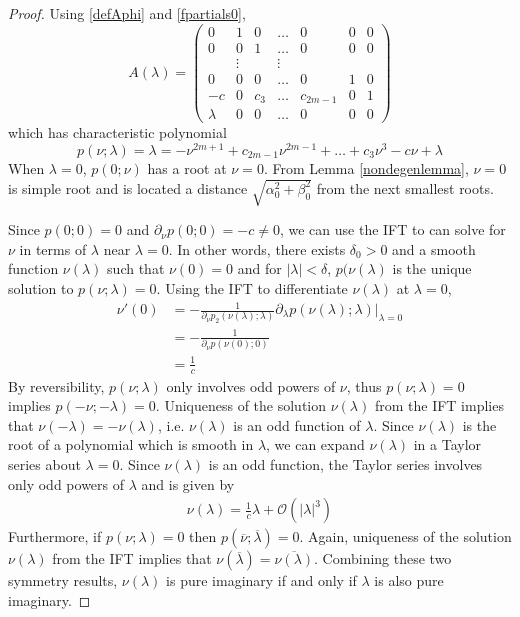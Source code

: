 \documentclass[thesis.tex]{subfiles}
\begin{document}
\begin{lemma}
\begin{proof}
Using \eqref{defAphi} and \eqref{fpartials0},
\begin{equation}\label{Alambdaform}
A(\lambda) = 
\begin{pmatrix}
0 & 1 & 0 & \dots & 0 & 0 & 0 \\
0 & 0 & 1 & \dots & 0 & 0 & 0\\
& \vdots && \vdots \\
0 & 0 & 0 & \dots & 0 & 1 & 0 \\
- c & 0 & c_3 & \dots & c_{2m-1} & 0 & 1 \\
\lambda & 0 & 0 & \dots & 0 & 0 & 0
\end{pmatrix}
\end{equation}
which has characteristic polynomial
\begin{equation}\label{charpolyA0lambda}
p(\nu; \lambda) = \lambda = -\nu^{2m+1} + c_{2m-1} \nu^{2m-1} + \dots + c_3 \nu^3 - c \nu + \lambda
\end{equation}
When $\lambda = 0$, $p(0; \nu)$ has a root at $\nu = 0$. From Lemma \ref{nondegenlemma}, $\nu = 0$ is simple root and is located a distance $\sqrt{\alpha_0^2 + \beta_0^2}$ from the next smallest roots. 

Since $p(0; 0) = 0$ and $\partial_\nu p(0; 0) = -c \neq 0$, we can use the IFT to can solve for $\nu$ in terms of $\lambda$ near $\lambda = 0$. In other words, there exists $\delta_0 > 0$ and a smooth function $\nu(\lambda)$ such that $\nu(0) = 0$ and for $|\lambda| < \delta$, $p(\nu(\lambda)$ is the unique solution to $p(\nu; \lambda) = 0$. Using the IFT to differentiate $\nu(\lambda)$ at $\lambda = 0$,
\begin{align*}
\nu'(0) &= -\frac{1}{\partial_\nu p_2(\nu(\lambda); \lambda) } \partial_\lambda p ( \nu(\lambda); \lambda ) \Big|_{\lambda = 0}\\
&= -\frac{1}{\partial_\nu p(\nu(0); 0) } \\
&= \frac{1}{c}
\end{align*}
By reversibility, $p(\nu; \lambda)$ only involves odd powers of $\nu$, thus $p(\nu; \lambda) = 0$ implies $p(-\nu; -\lambda) = 0$. Uniqueness of the solution $\nu(\lambda)$ from the IFT implies that $\nu(-\lambda) = -\nu(\lambda)$, i.e. $\nu(\lambda)$ is an odd function of $\lambda$. Since $\nu(\lambda)$ is the root of a polynomial which is smooth in $\lambda$, we can expand $\nu(\lambda)$ in a Taylor series about $\lambda = 0$. Since $\nu(\lambda)$ is an odd function, the Taylor series involves only odd powers of $\lambda$ and is given by
\begin{align*}
\nu(\lambda) = \frac{1}{c} \lambda + \mathcal{O}(|\lambda|^3)
\end{align*}
Furthermore, if $p(\nu; \lambda) = 0$ then $p(\overline{\nu}; \overline{\lambda}) = 0$. Again, uniqueness of the solution $\nu(\lambda)$ from the IFT implies that $\nu(\overline{\lambda}) = \overline{\nu(\lambda)}$. Combining these two symmetry results, $\nu(\lambda)$ is pure imaginary if and only if $\lambda$ is also pure imaginary.


\end{proof}
\end{lemma}
\end{document}
